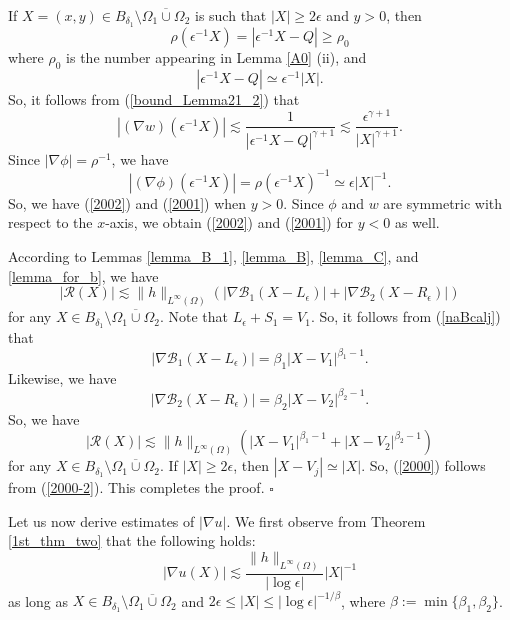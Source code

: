 \documentclass[11pt,a4paper]{article}
\numberwithin{equation}{section}
\newcommand{\qed}{\hfill \ensuremath{\square}}
\newcommand{\norm}[1]{\| #1 \|}
\newcommand{\eqnref}[1]{(\ref {#1})}
\newcommand{\Bcal}{\mathcal{B}}
\newcommand{\Rcal}{\mathcal{R}}
\newcommand{\Gb}{\beta}
\newcommand{\Gd}{\delta}
\newcommand{\Ge}{\epsilon}
\newcommand{\Gf}{\phi}
\newcommand{\Gg}{\gamma}
\newcommand{\Gr}{\rho}
\newcommand{\GO}{\Omega}
\newcommand{\beq}{\begin{equation}}
\newcommand{\eeq}{\end{equation}}
\begin{document}
If $X=(x,y)\in B_{\Gd_1} \setminus \overline{ \GO_1 \cup \GO_2}$ is such that $|X| \ge 2\Ge$ and $y>0$, then 
$$
\Gr(\Ge^{-1}X)= |\Ge^{-1} X-Q| \ge \Gr_0
$$ 
where $\Gr_0$ is the number appearing in Lemma \ref{A0} (ii), and 
$$
|\Ge^{-1} X-Q| \simeq \Ge^{-1} |X|.
$$ 
So, it follows from \eqnref{bound_Lemma21_2} that
$$
| \left(\nabla w\right)(\Ge^{-1}X) | \lesssim \frac{1}{\left| \Ge^{-1} X- Q \right|^{{\Gg}+1}} \lesssim \frac{\Ge^{\Gg+1}}{|X|^{{\Gg}+1}}.
$$
Since $|\nabla \Gf| = \Gr^{-1}$, we have
$$
|(\nabla\Gf)(\Ge^{-1} X)| = \Gr(\Ge^{-1} X)^{-1} \simeq \Ge |X|^{-1}.
$$
So, we have \eqnref{2002} and \eqnref{2001} when $y>0$. Since $\Gf$ and $w$ are symmetric with respect to the $x$-axis, we obtain \eqnref{2002} and \eqnref{2001} for $y<0$ as well.

According to Lemmas \ref{lemma_B_1}, \ref{lemma_B}, \ref{lemma_C}, and \ref{lemma_for_b}, we have
\beq\label{2000-1}
|\Rcal(X) | \lesssim \norm{h}_{L^{\infty} (\GO)} \left(\left| \nabla \Bcal_1 ( X-L_\Ge ) \right | + \left| \nabla \Bcal_2 ( X-R_\Ge ) \right |\right)
\eeq
for any $X \in B_{\Gd_1} \setminus \overline{\GO_1 \cup \GO_2}$. Note that $L_\Ge + S_1=V_1$. So, it follows from \eqnref{naBcalj} that
$$
|\nabla \Bcal_1 (X-L_\Ge)| = \Gb_1 |X-V_1|^{\Gb_1-1}.
$$
Likewise, we have
$$
|\nabla \Bcal_2 (X-R_\Ge)| = \Gb_2 |X-V_2|^{\Gb_2-1}.
$$
So, we have
\beq\label{2000-2}
|\Rcal(X) | \lesssim \norm{h}_{L^{\infty} (\GO)} \left( |X-V_1|^{\Gb_1-1} + |X-V_2|^{\Gb_2-1} \right)
\eeq
for any $X \in B_{\Gd_1} \setminus \overline{\GO_1 \cup \GO_2}$. If $|X| \ge 2\Ge$, then $|X-V_j| \simeq |X|$. So, \eqnref{2000} follows from \eqnref{2000-2}. This completes the proof. \qed

\medskip

Let us now derive estimates of $|\nabla u|$. We first observe from Theorem \ref{1st_thm_two} that the following holds:
$$
|\nabla u(X)| \lesssim \frac{\norm{h}_{L^{\infty} (\GO)}}{|\log \Ge|} |X|^{-1}
$$
as long as $X \in B_{\Gd_1} \setminus \overline{ \GO_1 \cup \GO_2}$ and $2 \Ge \le |X| \le |\log\Ge|^{-1/\Gb}$, where $\Gb:= \min \{\Gb_1, \Gb_2 \}$. 
\end{document}
